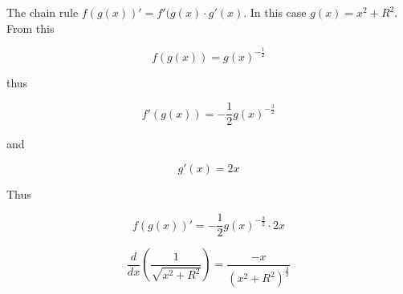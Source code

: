\documentclass[14pt]{memoir}
\begin{document}
The chain rule $ f(g(x))' = f'(g(x) \cdot g'(x)$. In this case $g(x) = x^2 + R^2$. From this

\begin{equation}
f(g(x)) = g(x)^{-\frac{1}{2}} 
\end{equation}

thus  

\begin{equation}
f'(g(x)) = -\frac{1}{2} g(x)^{-\frac{3}{2}} 
\end{equation}

and

\begin{equation}
g'(x) = 2x
\end{equation}

Thus

\begin{equation}
f(g(x))' =  -\frac{1}{2} g(x)^{-\frac{3}{2}}  \cdot 2x
\end{equation}

\begin{equation}
\frac{d}{dx} (\frac{1}{\sqrt{x^2+R^2}}) = \frac{-x}{(x^2 + R^2)^\frac{3}{2}}
\end{equation}
\end{document}
